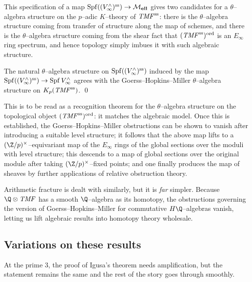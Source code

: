 \noindent This specification of a map $\operatorname{Spf} ((V^\wedge_\infty)^{\mathrm{ss}}) \to \mathcal{M}_{\mathbf{ell}}$ gives two candidates for a $\theta$--algebra structure on the $p$--adic $K$--theory of $\mathit{TMF}^{\mathrm{ss}}$: there is the $\theta$--algebra structure coming from transfer of structure along the map of schemes, and there is the $\theta$--algebra structure coming from the shear fact that $(\mathit{TMF}^{\mathrm{ss}})^{\mathrm{ord}}$ is an $E_\infty$ ring spectrum, and hence topology simply imbues it with such algebraic structure.

\begin{theorem}
The natural $\theta$--algebra structure on $\operatorname{Spf} ((V^\wedge_\infty)^{\mathrm{ss}})$ induced by the map $\operatorname{Spf} ((V^\wedge_\infty)^{\mathrm{ss}}) \to \operatorname{Spf} V^\wedge_\infty$ agrees with the Goerss--Hopkins--Miller $\theta$--algebra structure on $K_p (\mathit{TMF}^{\mathrm{ss}})$. \qed
\end{theorem}

\noindent This is to be read as a recognition theorem for the $\theta$--algebra structure on the topological object $(\mathit{TMF}^{\mathrm{ss}})^{\mathrm{ord}}$: it matches the algebraic model.  Once this is established, the Goerss--Hopkins--Miller obstructions can be shown to vanish after introducing a suitable level structure; it follows that the above map lifts to a $(\Z/p)^{\times}$--equivariant map of the $E_\infty$ rings of the global sections over the moduli with level structure; this descends to a map of global sections over the original module after taking $(\Z/p)^\times$--fixed points; and one finally produces the map of sheaves by further applications of relative obstruction theory.

\begin{remark}
Arithmetic fracture is dealt with similarly, but it is \emph{far} simpler.  Because $\Q \otimes \TMF$ has a smooth $\Q$--algebra as its homotopy, the obstructions governing the version of Goerss--Hopkins--Miller for commutative $H\Q$--algebras vanish, letting us lift algebraic results into homotopy theory wholesale.
\end{remark}






\subsection*{Variations on these results}

\begin{remark}
At the prime $3$, the proof of Igusa's theorem needs amplification, but the statement remains the same and the rest of the story goes through smoothly.
\end{remark}

